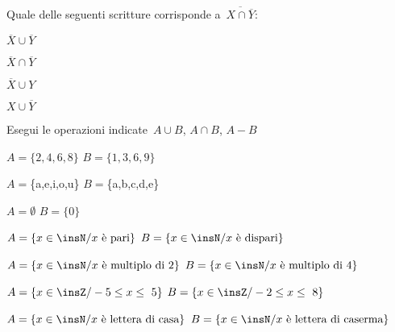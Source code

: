 \begin{esercizio}
\label{ese:7.56}
Quale delle seguenti scritture corrisponde a~\(\overline{{X\cap \overline{Y}}}\):
\vspace{-6pt}
\begin{multicols}{4}
 \begin{enumeratea}
 \item \(\overline{X}\cup \overline{Y}\)
 \item \(\overline{X}\cap \overline{Y}\)
 \item \(\overline{X}\cup Y\)
 \item \(X\cup \overline{Y}\)
 \end{enumeratea}
\end{multicols}
\end{esercizio}


\begin{esercizio}
\label{ese:7.57}
Esegui le operazioni indicate~\(A\cup B\), \(A\cap B\), \(A-B\)
\vspace{-6pt}

\begin{enumeratea}
\item \(A=\{2,4,6,8\}\) \(B=\{1,3,6,9\}\)
\item \(A=\)\{a,e,i,o,u\} \(B=\)\{a,b,c,d,e\}
\item \(A=\emptyset \) \(B=\{0\}\)
\item \(A=\{x\in\insN/ x\text{ è pari}\}\) \(B=\{x\in\insN/ x\text{ è dispari}\}\)
\item \(A=\{x\in\insN/ x\text{ è multiplo di~2}\}\) \(B=\{x\in\insN/ x\text{ è 
multiplo di~4}\}\)
\item \(A=\{x\in\insZ/-5\le x\le~5\}\) \(B=\{x\in\insZ/-2\le x\le~8\}\)
\item \(A=\{x\in\insN/ x\text{ è lettera di casa}\}\) \(B=\{x\in\insN/ x\text{ è 
lettera di caserma}\}\)
\end{enumeratea}
\end{esercizio}

